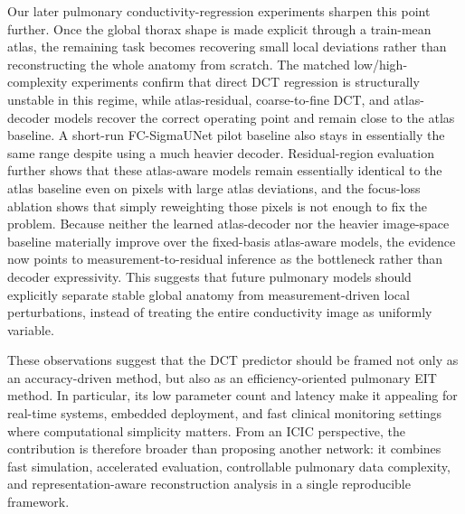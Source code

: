 \documentclass[11pt,a4paper]{article}
\begin{document}
Our later pulmonary conductivity-regression experiments sharpen this point further. Once the global thorax shape is made explicit through a train-mean atlas, the remaining task becomes recovering small local deviations rather than reconstructing the whole anatomy from scratch. The matched low/high-complexity experiments confirm that direct DCT regression is structurally unstable in this regime, while atlas-residual, coarse-to-fine DCT, and atlas-decoder models recover the correct operating point and remain close to the atlas baseline. A short-run FC-SigmaUNet pilot baseline also stays in essentially the same range despite using a much heavier decoder. Residual-region evaluation further shows that these atlas-aware models remain essentially identical to the atlas baseline even on pixels with large atlas deviations, and the focus-loss ablation shows that simply reweighting those pixels is not enough to fix the problem. Because neither the learned atlas-decoder nor the heavier image-space baseline materially improve over the fixed-basis atlas-aware models, the evidence now points to measurement-to-residual inference as the bottleneck rather than decoder expressivity. This suggests that future pulmonary models should explicitly separate stable global anatomy from measurement-driven local perturbations, instead of treating the entire conductivity image as uniformly variable.

These observations suggest that the DCT predictor should be framed not only as an accuracy-driven method, but also as an efficiency-oriented pulmonary EIT method. In particular, its low parameter count and latency make it appealing for real-time systems, embedded deployment, and fast clinical monitoring settings where computational simplicity matters. From an ICIC perspective, the contribution is therefore broader than proposing another network: it combines fast simulation, accelerated evaluation, controllable pulmonary data complexity, and representation-aware reconstruction analysis in a single reproducible framework.
\end{document}
